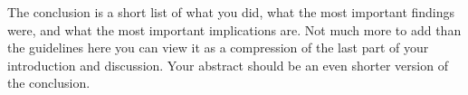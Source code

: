 The conclusion is a short list of what you did, what the most important findings were, and what the most important implications are. Not much more to add than the guidelines here you can view it as a compression of the last part of your introduction and discussion. Your abstract should be an even shorter version of the conclusion.
